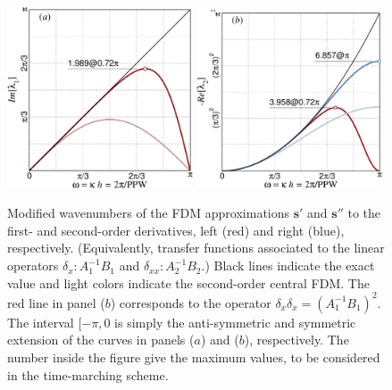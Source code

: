 \begin{figure}
\includegraphics[clip,width=0.49\textwidth]{figs/Fdm1}\hfill
\includegraphics[clip,width=0.49\textwidth]{figs/Fdm2}
\caption{Modified wavenumbers of the FDM approximations $\mathbf{s'}$ and
  $\mathbf{s''}$ to the first- and second-order derivatives, left (red) and
  right (blue), respectively. (Equivalently, transfer functions associated to
  the linear operators $\delta_{x}: A_1^{-1}B_1$ and $\delta_{xx}:
  A_2^{-1}B_2$.) Black lines indicate the exact value and light colors indicate
  the second-order central FDM. The red line in panel ($b$) corresponds to the
  operator $\delta_{x}\delta_{x} =(A_1^{-1}B_1)^2$. The interval $[-\pi,0$ is
    simply the anti-symmetric and symmetric extension of the curves in panels
    ($a$) and ($b$), respectively. The number inside the figure give the maximum
    values, to be considered in the time-marching scheme.}\label{fig:fdm}
\end{figure}


